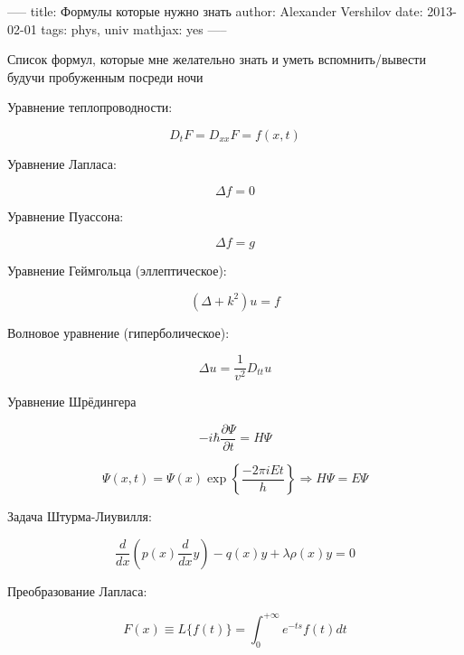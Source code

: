 -----
title: Формулы которые нужно знать
author: Alexander Vershilov
date: 2013-02-01
tags: phys, univ
mathjax: yes
-----


Список формул, которые мне желательно знать и уметь вспомнить/вывести будучи пробуженным посреди ночи

Уравнение теплопроводности:

$$ D_t F = D_{xx} F = f(x,t) $$

Уравнение Лапласа:

$$ \Delta f = 0 $$

Уравнение Пуассона:

$$ \Delta f = g $$

Уравнение Геймгольца (эллептическое):

$$ (\Delta + k^2) u = f $$

Волновое уравнение (гиперболическое):

$$ \Delta u = \frac{1}{v^2} D_{tt} u $$

Уравнение Шрёдингера

$$ -i \hbar \frac{\partial \Psi}{\partial t} = H \Psi $$

$$ \Psi(x,t) = \Psi(x) \exp\left\{ \frac{-2\pi i E t}{h}\right\} \Rightarrow H\Psi = E\Psi$$

Задача Штурма-Лиувилля:

$$ \frac{d}{dx} \left( p(x) \frac{d}{dx} y \right) - q(x)y+\lambda\rho(x)y=0 $$

Преобразование Лапласа:

$$ F(x) \equiv L\{f(t)\} = \int_0^{+\infty}e^{-ts}f(t)dt$$





